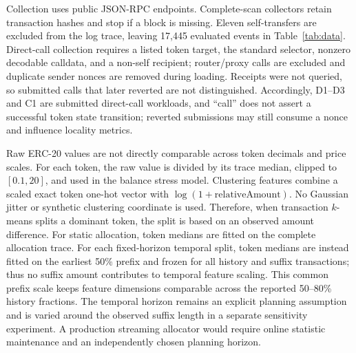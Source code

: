 \documentclass[runningheads]{llncs}
\begin{document}
\begin{table}[t]
\caption{Measured traces. Blocks/span shows represented blocks over the inclusive
height span. D1 has documented gaps; D2, D3, and C1 cover their full spans.
Top token is the share of the most frequent contract; Multi-tok. is the share
of calls/events from repeat senders active in multiple tokens.}
\label{tab:data}
\centering
\small
{}
\end{table}

Collection uses public JSON-RPC endpoints. Complete-scan collectors retain
transaction hashes and stop if a block is missing. Eleven self-transfers are
excluded from the log trace, leaving 17,445 evaluated events in
Table~\ref{tab:data}. Direct-call collection requires a listed token target,
the standard selector, nonzero decodable calldata, and a non-self recipient;
router/proxy calls are excluded and duplicate sender nonces are removed during
loading. Receipts were not queried, so submitted calls that later reverted are
not distinguished. Accordingly, D1--D3 and C1 are submitted direct-call
workloads, and ``call'' does not assert a successful token state transition;
reverted submissions may still consume a nonce and influence locality metrics.

Raw ERC-20 values are not directly comparable across token decimals and price
scales. For each token, the raw value is divided by its trace median, clipped to
$[0.1,20]$, and used in the balance stress model. Clustering features combine a
scaled exact token one-hot vector with
$\log(1+\mathrm{relativeAmount})$. No Gaussian jitter or synthetic clustering
coordinate is used. Therefore, when transaction $k$-means splits a dominant
token, the split is based on an observed amount difference.
For static allocation, token medians are fitted on the complete allocation
trace. For each fixed-horizon temporal split, token medians are instead fitted
on the earliest 50\% prefix and frozen for all history and suffix transactions;
thus no suffix amount contributes to temporal feature scaling. This common
prefix scale keeps feature dimensions comparable across the reported 50--80\%
history fractions. The temporal horizon remains an explicit planning assumption
and is varied around the observed suffix length in a separate sensitivity
experiment. A production streaming allocator would require online statistic
maintenance and an independently chosen planning horizon.
\end{document}
